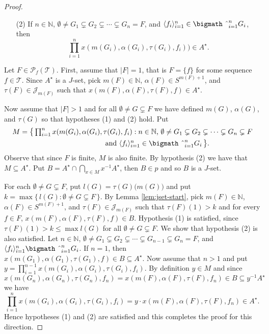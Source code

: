 \documentclass[12pt]{article}
\theoremstyle{plain}
\theoremstyle{definition}
\newcommand{\la}{\langle}
\newcommand{\ra}{\rangle}
\newcommand{\bbN}{\mathbb{N}}
\newcommand{\calJ}{\mathcal{J}}
\newcommand{\calT}{\mathcal{T}}
\newcommand{\Pf}{\mathcal{P}_f}
\newcommand{\bigtimes}{\hbox{\bigmath \char'2}}
\begin{document}
\begin{proof}
\begin{itemize}
    \item[(2)] If $n \in \bbN$, $\emptyset \ne G_1 \subsetneq G_2 \subsetneq \cdots \subsetneq G_n = F$, and $\la f_i \ra_{i=1}^n \in \bigtimes_{i=1}^n G_i$, then \[\textstyle \prod_{i=1}^n x(m(G_i), \alpha(G_i), \tau(G_i), f_i)) \in A^\star.\]
  \end{itemize}

  Let $F \in \Pf(\calT)$.
  First, assume that $|F| = 1$, that is $F = \{f\}$ for some sequence $f \in \calT$.
  Since $A^\star$ is a $J$-set, pick $m(F) \in \bbN$, $\alpha(F) \in S^{m(F)+1}$, and $\tau(F) \in \calJ_{m(F)}$ such that $x(m(F), \alpha(F), \tau(F), f) \in A^\star$. 

  Now assume that $|F| > 1$ and for all $\emptyset \ne G \subsetneq F$ we have defined $m(G)$, $\alpha(G)$, and $\tau(G)$ so that hypotheses (1) and (2) hold.
  Put 
  \begin{align*}
    M &= \bigl\{\, \textstyle \prod_{i=1}^n x(m(G_i), \alpha(G_i), \tau(G_i), f_i) : \mbox{$n \in \bbN$, $\emptyset \ne G_1 \subsetneq G_2 \subsetneq \cdots \subsetneq G_n \subsetneq F$} \\
    &\hspace{12em} \mbox{and $\la f_i \ra_{i=1}^n \in \bigtimes_{i=1}^n G_i$} \,\bigr\}.
  \end{align*}
  Observe that since $F$ is finite, $M$ is also finite.
  By hypothesis (2) we have that $M \subseteq A^\star$.
  Put $B = A^\star \cap \bigcap_{x \in M} x^{-1}A^\star$, then $B \in p$ and so $B$ is a $J$-set. 

  For each $\emptyset \ne G \subsetneq F$, put $l(G) = \tau(G)\bigl( m(G) \bigr)$ and put $k = \max\{\, l(G) : \emptyset \ne G \subsetneq F \,\}$.
  By Lemma \ref{lem:jset-start}, pick $m(F) \in \bbN$, $\alpha(F) \in S^{m(F)+1}$, and $\tau(F) \in \calJ_{m(F)}$ such that $\tau(F)(1) > k$ and for every $f \in F$, $x(m(F), \alpha(F), \tau(F), f) \in B$.
  Hypothesis (1) is satisfied, since $\tau(F)(1) > k \le \max l(G)$ for all $\emptyset \ne G \subsetneq F$.
  We show that hypothesis (2) is also satisfied.
  Let $n \in \bbN$, $\emptyset \ne G_1 \subsetneq G_2 \subsetneq \cdots \subsetneq G_{n-1} \subsetneq G_n = F$, and $\la f_i \ra_{i=1}^n \bigtimes_{i=1}^n G_i$. 
  If $n = 1$, then $x(m(G_1), \alpha(G_1), \tau(G_1), f) \in B \subseteq A^\star$.
  Now assume that $n > 1$ and put $y = \prod_{i=1}^{n-1} x(m(G_i), \alpha(G_i), \tau(G_i), f_i)$. 
  By definition $y \in M$ and since $x(m(G_n), \alpha(G_n), \tau(G_n), f_n) = x(m(F), \alpha(F), \tau(F), f_n) \in B \subseteq y^{-1}A^\star$ we have
  \[
    \textstyle
    \prod_{i=1}^n x(m(G_i), \alpha(G_i), \tau(G_i), f_i) = y \cdot x(m(F), \alpha(F), \tau(F), f_n) \in A^\star.
  \]
  Hence hypotheses (1) and (2) are satisfied and this completes the proof for this direction.
\end{proof}
\end{document}
